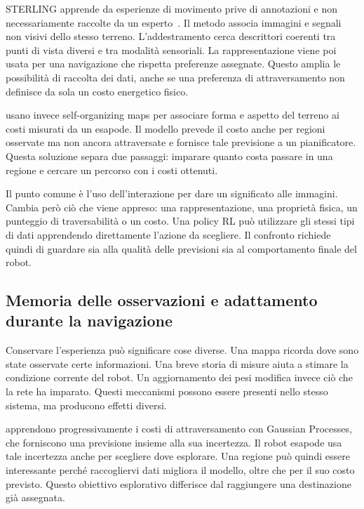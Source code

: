 STERLING apprende da esperienze di movimento prive di annotazioni e non necessariamente raccolte da un esperto~\citep{Karnan2023STERLING}. Il metodo associa immagini e segnali non visivi dello stesso terreno. L'addestramento cerca descrittori coerenti tra punti di vista diversi e tra modalità sensoriali. La rappresentazione viene poi usata per una navigazione che rispetta preferenze assegnate. Questo amplia le possibilità di raccolta dei dati, anche se una preferenza di attraversamento non definisce da sola un costo energetico fisico.

\citet{Faigl2019Unsupervised} usano invece self-organizing maps per associare forma e aspetto del terreno ai costi misurati da un esapode. Il modello prevede il costo anche per regioni osservate ma non ancora attraversate e fornisce tale previsione a un pianificatore. Questa soluzione separa due passaggi: imparare quanto costa passare in una regione e cercare un percorso con i costi ottenuti.

Il punto comune è l'uso dell'interazione per dare un significato alle immagini. Cambia però ciò che viene appreso: una rappresentazione, una proprietà fisica, un punteggio di traversabilità o un costo. Una policy RL può utilizzare gli stessi tipi di dati apprendendo direttamente l'azione da scegliere. Il confronto richiede quindi di guardare sia alla qualità delle previsioni sia al comportamento finale del robot.

\subsection{Memoria delle osservazioni e adattamento durante la navigazione}

Conservare l'esperienza può significare cose diverse. Una mappa ricorda dove sono state osservate certe informazioni. Una breve storia di misure aiuta a stimare la condizione corrente del robot. Un aggiornamento dei pesi modifica invece ciò che la rete ha imparato. Questi meccanismi possono essere presenti nello stesso sistema, ma producono effetti diversi.

\citet{Pragr2019Online} apprendono progressivamente i costi di attraversamento con Gaussian Processes, che forniscono una previsione insieme alla sua incertezza. Il robot esapode usa tale incertezza anche per scegliere dove esplorare. Una regione può quindi essere interessante perché raccogliervi dati migliora il modello, oltre che per il suo costo previsto. Questo obiettivo esplorativo differisce dal raggiungere una destinazione già assegnata.

